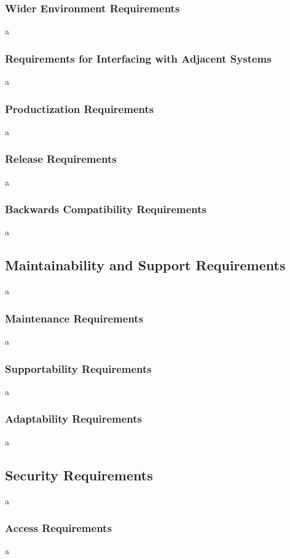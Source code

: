 \documentclass[12pt]{article}
\begin{document}
\subsubsection{Wider Environment Requirements}
a

\subsubsection{Requirements for Interfacing with Adjacent Systems}
a

\subsubsection{Productization Requirements}
a

\subsubsection{Release Requirements}
a

\subsubsection{Backwards Compatibility Requirements}
a

\subsection{Maintainability and Support Requirements}
a

\subsubsection{Maintenance Requirements}
a

\subsubsection{Supportability Requirements}
a

\subsubsection{Adaptability Requirements}
a

\subsection{Security Requirements}
a

\subsubsection{Access Requirements}
a
\end{document}
